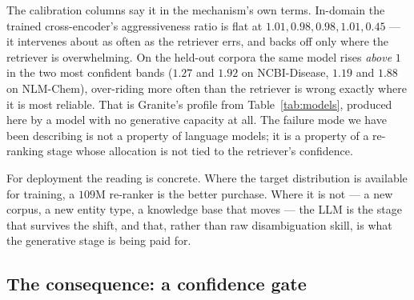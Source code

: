 \documentclass[11pt]{article}
\begin{document}
The calibration columns say it in the mechanism's own terms. In-domain the trained
cross-encoder's aggressiveness ratio is flat at $1.01, 0.98, 0.98, 1.01, 0.45$ --- it
intervenes about as often as the retriever errs, and backs off only where the retriever
is overwhelming. On the held-out corpora the same model rises \emph{above} $1$ in the
two most confident bands ($1.27$ and $1.92$ on NCBI-Disease, $1.19$ and $1.88$ on
NLM-Chem), over-riding more often than the retriever is wrong exactly where it is most
reliable. That is Granite's profile from Table~\ref{tab:models}, produced here by a
model with no generative capacity at all. The failure mode we have been describing is
not a property of language models; it is a property of a re-ranking stage whose
allocation is not tied to the retriever's confidence.

For deployment the reading is concrete. Where the target distribution is available for
training, a $109$M re-ranker is the better purchase. Where it is not --- a new corpus, a
new entity type, a knowledge base that moves --- the LLM is the stage that survives the
shift, and that, rather than raw disambiguation skill, is what the generative stage is
being paid for.

\subsection{The consequence: a confidence gate}
\end{document}
